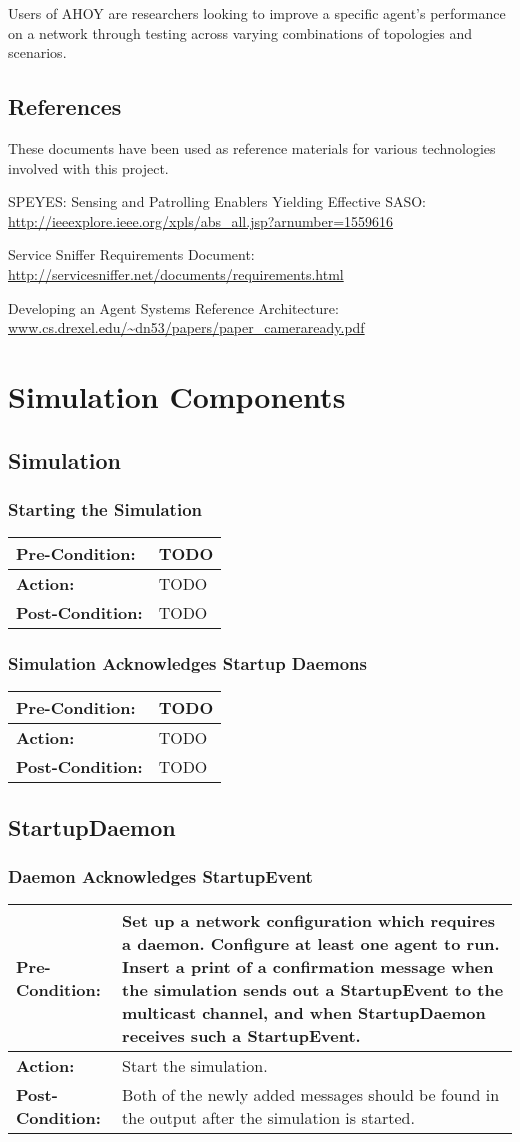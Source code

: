 \documentclass[titlepage]{article}
\renewenvironment{itemize*}
    {\begin{itemize}
        \setlength{\itemsep}{0pt}%
        \setlength{\parskip}{0pt}%
        \setlength{\partopsep}{0pt}%
        \setlength{\topsep}{0pt}}%
    {\end{itemize}}
\newcommand{\testcase}[3]{
    \begin{center}
    \begin{tabular}{| l | p{0.7\textwidth}|}
        \hline
        \rowcolor[gray]{0.8}\textbf{Pre-Condition:} & #1 \\ \hline
        \textbf{Action:} & #2 \\ \hline
        \rowcolor[gray]{0.8}\textbf{Post-Condition:} & #3 \\ \hline
    \end{tabular}
    \end{center}
}
\begin{document}
Users of AHOY are researchers looking to improve a specific agent's performance on a network through testing across varying combinations of topologies and scenarios.

\subsection{References%
  \label{references}%
}

These documents have been used as reference materials for various technologies involved with this project.
%
\begin{itemize*}
	\item SPEYES: Sensing and Patrolling Enablers Yielding Effective SASO: \url{http://ieeexplore.ieee.org/xpls/abs_all.jsp?arnumber=1559616}
	\item Service Sniffer Requirements Document: \url{http://servicesniffer.net/documents/requirements.html}
    \item Developing an Agent Systems Reference Architecture: \url{www.cs.drexel.edu/~dn53/papers/paper_cameraready.pdf}
\end{itemize*}

\section{Simulation Components}
\subsection{Simulation}
\subsubsection{Starting the Simulation}

\testcase{TODO}{TODO}{TODO}

\subsubsection{Simulation Acknowledges Startup Daemons}

\testcase{TODO}{TODO}{TODO}

\subsection{StartupDaemon}
\subsubsection{Daemon Acknowledges StartupEvent}
\testcase{Set up a network configuration which requires a daemon.  Configure at least one agent to run.  Insert a print of a confirmation message when the simulation sends out a StartupEvent to the multicast channel, and when StartupDaemon receives such a StartupEvent.}{Start the simulation.}{Both of the newly added messages should be found in the output after the simulation is started.}
\end{document}
